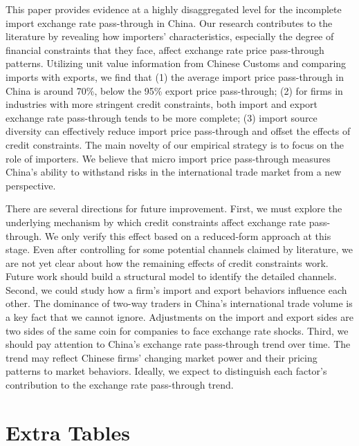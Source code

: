 \documentclass[12pt]{article}
\begin{document}
This paper provides evidence at a highly disaggregated level for the incomplete import exchange rate pass-through in China. Our research contributes to the literature by revealing how importers' characteristics, especially the degree of financial constraints that they face, affect exchange rate price pass-through patterns. Utilizing unit value information from Chinese Customs and comparing imports with exports, we find that (1) the average import price pass-through in China is around 70\%, below the 95\% export price pass-through; (2) for firms in industries with more stringent credit constraints, both import and export exchange rate pass-through tends to be more complete; (3) import source diversity can effectively reduce import price pass-through and offset the effects of credit constraints. The main novelty of our empirical strategy is to focus on the role of importers. We believe that micro import price pass-through measures China's ability to withstand risks in the international trade market from a new perspective.

There are several directions for future improvement. First, we must explore the underlying mechanism by which credit constraints affect exchange rate pass-through. We only verify this effect based on a reduced-form approach at this stage. Even after controlling for some potential channels claimed by literature, we are not yet clear about how the remaining effects of credit constraints work. Future work should build a structural model to identify the detailed channels. Second, we could study how a firm's import and export behaviors influence each other. The dominance of two-way traders in China's international trade volume is a key fact that we cannot ignore. Adjustments on the import and export sides are two sides of the same coin for companies to face exchange rate shocks. Third, we should pay attention to China's exchange rate pass-through trend over time. The trend may reflect Chinese firms' changing market power and their pricing patterns to market behaviors. Ideally, we expect to distinguish each factor's contribution to the exchange rate pass-through trend. 

\newpage 


\appendix

\newpage

\section{Extra Tables}\label{Appendix-Tables}
\end{document}
